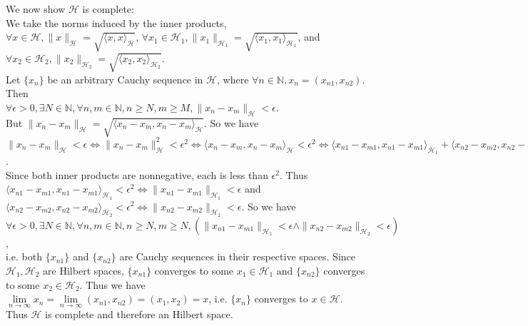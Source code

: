 \documentclass[12pt,a4paper]{article}
\newcommand{\h}{\mathcal{H}}
\newcommand{\N}{\mathbb{N}}
\newcommand{\norm}[1]{\| #1 \|}
\newcommand{\inner}[1]{\langle #1 \rangle}
\theoremstyle{plain}
\theoremstyle{remark}
\theoremstyle{definition}
\begin{document}
\vspace{5 mm}
We now show $\h$ is complete:\\
We take the norms induced by the inner products,\\
$\forall x \in \h, \norm{x}_{\h} = \sqrt{\inner{x,x}_{\h}}$, $\forall x_1 \in \h_1, \norm{x_1}_{\h_1} = \sqrt{\inner{x_1,x_1}_{\h_1}}$, and\\
 $\forall x_2 \in \h_2, \norm{x_2}_{\h_2} = \sqrt{\inner{x_2,x_2}_{\h_2}}$.\\
Let $\{x_n\}$ be an arbitrary Cauchy sequence in $\h$, where $\forall n \in \N, x_n = (x_{n1},x_{n2})$. Then\\
$\forall \epsilon>0, \exists N \in \N, \forall n,m \in \N, n\ge N, m\ge M, \norm{x_n - x_m}_{\h} < \epsilon$.\\
But $\norm{x_n - x_m}_{\h} = \sqrt{\inner{x_n - x_m, x_n - x_m}_{\h}}$. So we have\\
$\norm{x_n - x_m}_{\h} < \epsilon \Leftrightarrow \norm{x_n - x_m}_{\h}^2 < \epsilon^2 \Leftrightarrow \inner{x_n - x_m, x_n - x_m}_{\h} < \epsilon^2 \Leftrightarrow \inner{x_{n1} - x_{m1}, x_{n1} - x_{m1}}_{\h_1} + \inner{x_{n2} - x_{m2}, x_{n2} - x_{m2}}_{\h_2} < \epsilon^2$.\\
Since both inner products are nonnegative, each is less than $\epsilon^2$. Thus\\
$\inner{x_{n1} - x_{m1}, x_{n1} - x_{m1}}_{\h_1} < \epsilon^2 \Leftrightarrow \norm{x_{n1} - x_{m1}}_{\h_1} < \epsilon$ and\\
$\inner{x_{n2} - x_{m2}, x_{n2} - x_{m2}}_{\h_2} < \epsilon^2 \Leftrightarrow \norm{x_{n2} - x_{m2}}_{\h_2} < \epsilon$. So we have\\
$\forall \epsilon > 0, \exists N \in \N, \forall n,m \in \N, n \ge N, m \ge N, \left(\norm{x_{n1} - x_{m1}}_{\h_1} < \epsilon \land \norm{x_{n2} - x_{m2}}_{\h_2} < \epsilon \right)$,\\
i.e. both $\{x_{n1}\}$ and $\{x_{n2}\}$ are Cauchy sequences in their respective spaces. Since $\h_1,\h_2$ are Hilbert spaces, $\{x_{n1}\}$ converges to some $x_1 \in \h_1$ and $\{x_{n2}\}$ converges to some $x_2 \in \h_2$. Thus we have\\
$\lim\limits_{n \to \infty} x_n = \lim\limits_{n \to \infty} (x_{n1},x_{n2}) = (x_1,x_2) = x$, i.e. $\{x_n\}$ converges to $x \in \h$.\\
Thus $\h$ is complete and therefore an Hilbert space.
\end{document}
